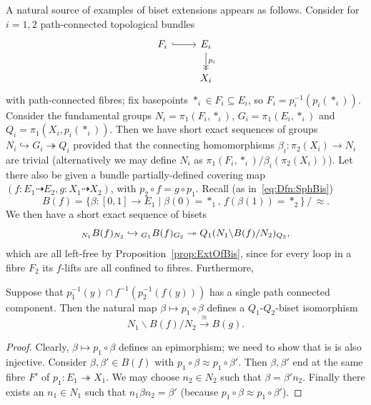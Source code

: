 \documentclass{amsart}
\begin{document}
\begin{exple}
  A natural source of examples of biset extensions appears as
  follows. Consider for $i=1,2$ path-connected topological bundles
\begin{equation}\label{eq:bundle}
  \begin{tikzcd}
    F_i\arrow[hook]{r} & E_i\arrow[->>]{d}{p_i}\\
    & X_i
  \end{tikzcd}
\end{equation}
with path-connected fibres; fix basepoints $*_i\in F_i\subseteq E_i$,
so $F_i=p_i^{-1}(p_i(*_i))$. Consider the fundamental groups
$N_i=\pi_1(F_i,*_i)$, $G_i=\pi_1(E_i,*_i)$ and
$Q_i=\pi_1(X_i,p_i(*_i))$. Then we have short exact sequences of
groups $N_i\hookrightarrow G_i\twoheadrightarrow Q_i$ provided that the connecting homomorphisms $\beta_i\colon \pi_2(X_i)\to N_i$ are trivial (alternatively we may define $N_i $ as $\pi_1(F_i,*_i)/\beta_i( \pi_2(X_i))$). Let there also
be given a bundle partially-defined covering map
$(f\colon E_1\dashrightarrow E_2,g\colon X_1\dashrightarrow X_2)$,
with $p_2\circ f=g\circ p_1$. Recall (as in~\eqref{eq:Dfn:SphBis})
\begin{equation}\label{eq:biset}
  B(f)=\{\beta\colon[0,1]\to E_1\mid\beta(0)=*_1,\,f(\beta(1))=*_2\}\,/\,{\approx}.
\end{equation}
We then have a short exact sequence of bisets
\[\subscript{N_1}B(f)_{N_2}\hookrightarrow\subscript{G_1}B(f)_{G_2}\twoheadrightarrow{Q_1}(N_1\backslash
  B(f)/N_2)_{Q_2},
\]
which are all left-free by Proposition~\ref{prop:ExtOfBis}, since 
for every loop in a fibre $F_2$ its $f$-lifts are all confined to
fibres. Furthermore,
\begin{lem}Suppose that $p_1^{-1}(y)\cap f^{-1}(p^{-1}_2(f(y)))$ has a single path connected component. Then the natural map $\beta\mapsto p_1\circ\beta$ defines a
  $Q_1$-$Q_2$-biset isomorphism
  \[N_1\backslash B(f)/N_2\overset\cong\longrightarrow B(g).\]
\end{lem}
\begin{proof}
  Clearly, $\beta\mapsto p_1\circ\beta$ defines an epimorphism; we
  need to show that is is also injective.  Consider
  $\beta,\beta'\in B(f)$ with $p_1\circ\beta\approx
  p_1\circ\beta'$. Then $\beta,\beta'$ end at the same fibre $F'$ of
  $p_1\colon E_1 \twoheadrightarrow X_1$. We may choose $n_2\in N_2$
  such that $\beta=\beta' n_2$. Finally there exists an $n_1\in N_1$
  such that $n_1\beta n_2=\beta'$ (because
  $p_1\circ\beta\approx p_1\circ\beta'$).
\end{proof}
\end{exple}
\end{document}
